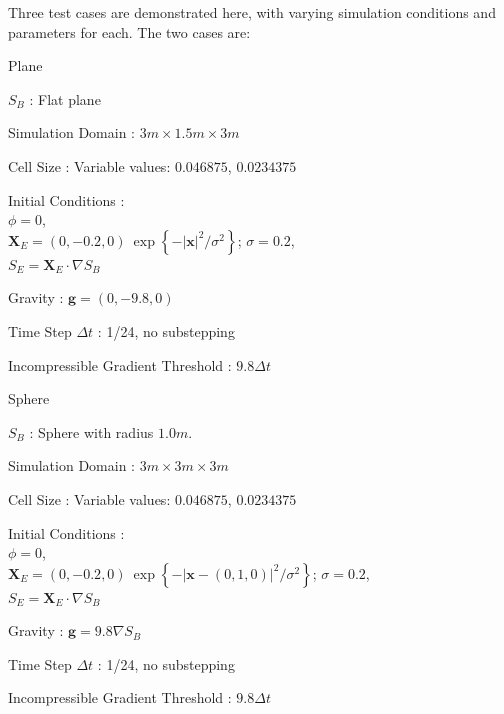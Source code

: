 \documentclass{article}
\def\xvec{\textbf{x}}
\def\gvec{\textbf{g}}
\def\Xvec{\textbf{X}}
\def\dt{\Delta t}
\begin{document}
Three test cases are demonstrated here, with varying simulation conditions and parameters for each. The two cases are:
\begin{description}
\item{Plane} 
   \begin{description}
   \item{$S_B$ :}  Flat plane
   \item{Simulation Domain :}  $3 m\times 1.5 m\times 3 m$
   \item{Cell Size :} Variable values: $0.046875$, $0.0234375$
   \item{Initial Conditions :} \\ $\phi = 0$,\\ $\Xvec_E = (0, -0.2, 0)\ \exp\left\{ -|\xvec|^2/\sigma^2  \right\}$; $\sigma=0.2$, \\ $S_E = \Xvec_E\cdot\nabla S_B$
   \item{Gravity :} $\gvec = (0,-9.8,0)$
   \item{Time Step $\dt$ :} 1/24, no substepping
   \item{Incompressible Gradient Threshold :} $9.8\dt$
   \end{description}

\item{Sphere}
   \begin{description}
   \item{$S_B$ :}  Sphere with radius $1.0m$.
   \item{Simulation Domain :}  $3 m\times 3 m\times 3 m$
   \item{Cell Size :} Variable values: $0.046875$, $0.0234375$
   \item{Initial Conditions :} \\ $\phi = 0$,\\ $\Xvec_E = (0, -0.2, 0)\ \exp\left\{ -|\xvec-(0,1,0)|^2/\sigma^2  \right\}$; $\sigma=0.2$, \\ $S_E = \Xvec_E\cdot\nabla S_B$
   \item{Gravity :} $\gvec = 9.8 \nabla S_B$
   \item{Time Step $\dt$ :} 1/24, no substepping
   \item{Incompressible Gradient Threshold :} $9.8\dt$
   \end{description}


\end{description}
\end{document}
